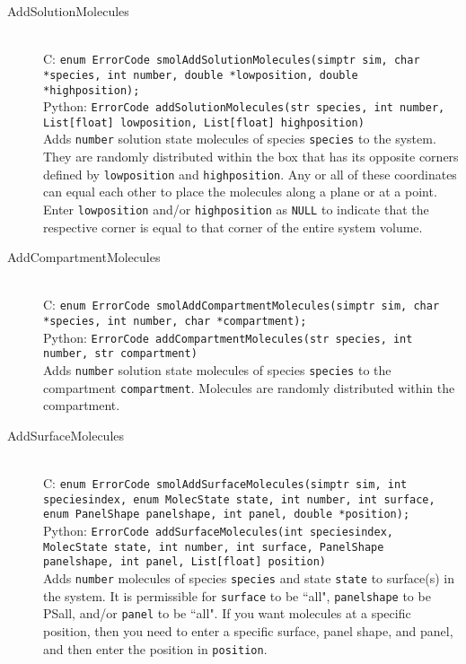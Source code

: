 \documentclass {book}
\begin{document}
\begin{description}
\item[AddSolutionMolecules]
\hfill \\
C: \texttt{enum ErrorCode smolAddSolutionMolecules(simptr sim, char *species, int number, double *lowposition, double *highposition);}\\
Python: \texttt{ErrorCode addSolutionMolecules(str species, int number, List[float] lowposition, List[float] highposition)}\\
Adds \texttt{number} solution state molecules of species \texttt{species} to the system. They are randomly distributed within the box that has its opposite corners defined by \texttt{lowposition} and \texttt{highposition}. Any or all of these coordinates can equal each other to place the molecules along a plane or at a point. Enter \texttt{lowposition} and/or \texttt{highposition} as \texttt{NULL} to indicate that the respective corner is equal to that corner of the entire system volume.

\item[AddCompartmentMolecules]
\hfill \\
C: \texttt{enum ErrorCode smolAddCompartmentMolecules(simptr sim, char *species, int number, char *compartment);}\\
Python: \texttt{ErrorCode addCompartmentMolecules(str species, int number, str compartment)}\\
Adds \texttt{number} solution state molecules of species \texttt{species} to the compartment \texttt{compartment}. Molecules are randomly distributed within the compartment.

\item[AddSurfaceMolecules]
\hfill \\
C: \texttt{enum ErrorCode smolAddSurfaceMolecules(simptr sim, int speciesindex, enum MolecState state, int number, int surface, enum PanelShape panelshape, int panel, double *position);}\\
Python: \texttt{ErrorCode addSurfaceMolecules(int speciesindex, MolecState state, int number, int surface, PanelShape panelshape, int panel, List[float] position)}\\
Adds \texttt{number} molecules of species \texttt{species} and state \texttt{state} to surface(s) in the system. It is permissible for \texttt{surface} to be ``all", \texttt{panelshape} to be PSall, and/or \texttt{panel} to be ``all". If you want molecules at a specific position, then you need to enter a specific surface, panel shape, and panel, and then enter the position in \texttt{position}.


\end{description}
\end{document}

